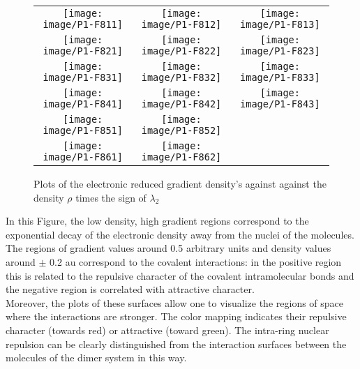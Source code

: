 		
		\begin{figure}[H]
			\begin{center}
				\begin{tabular}{c c c}
					\texttt{[image: image/P1-F811]} & \texttt{[image: image/P1-F812]} & \texttt{[image: image/P1-F813]}\\
					\texttt{[image: image/P1-F821]} & \texttt{[image: image/P1-F822]} & \texttt{[image: image/P1-F823]}\\
					\texttt{[image: image/P1-F831]} & \texttt{[image: image/P1-F832]} & \texttt{[image: image/P1-F833]}\\
					\texttt{[image: image/P1-F841]} & \texttt{[image: image/P1-F842]} & \texttt{[image: image/P1-F843]}\\
					\texttt{[image: image/P1-F851]} & \texttt{[image: image/P1-F852]} & \\
					\texttt{[image: image/P1-F861]} & \texttt{[image: image/P1-F862]} & \\
				\end{tabular}
			\end{center}
			\caption{Plots of the electronic reduced gradient density's against against the density $\rho$ times the sign of $\lambda_{2}$}
		\end{figure}
		
		In this Figure, the low density, high gradient regions correspond to the exponential decay of the electronic density away from the nuclei of the molecules. The regions of gradient values around 0.5 arbitrary units and density values around $\pm$ 0.2 au correspond to the covalent interactions: in the positive region this is related to the repulsive character of the covalent intramolecular bonds and the negative region is correlated with attractive character.\\
		
		Moreover, the plots of these surfaces allow one to visualize the regions of space where the interactions are stronger. The color mapping indicates their repulsive character (towards red) or attractive (toward green). The intra-ring nuclear repulsion can be clearly distinguished from the interaction surfaces between the molecules of the dimer system in this way.\\
		
